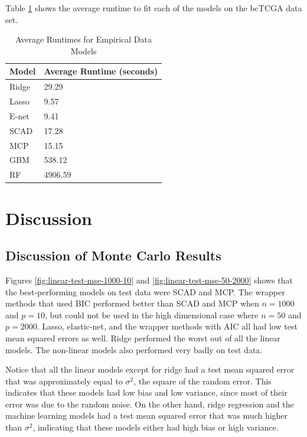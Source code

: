 \documentclass{article}
\begin{document}
	Table \ref{tab:emp_runtimes} shows the average runtime to fit each of the models on the bcTCGA data set.
	
	\begin{table}[h!]
		\centering
		\caption{Average Runtimes for Empirical Data Models}
		\label{tab:emp_runtimes}
		\begin{tabular}{ll}
			\hline
			\textbf{Model}        & \textbf{Average Runtime} (seconds) \\ \hline
			Ridge         & 29.29               \\
			Lasso         & 9.57                \\
			E-net	      & 9.41                \\
			SCAD          & 17.28               \\
			MCP           & 15.15               \\
			GBM      	  & 538.12              \\
			RF 			  & 4906.59             \\ \hline
		\end{tabular}
	\end{table}
	
	\newpage
	\section{Discussion}\label{sec:discussion}
	\subsection{Discussion of Monte Carlo Results}
	Figures \ref{fig:linear-test-mse-1000-10} and \ref{fig:linear-test-mse-50-2000} shows that the best-performing models on test data were SCAD and MCP. The wrapper methods that used BIC performed better than SCAD and MCP when $n = 1000$ and $p = 10$, but could not be used in the high dimensional case where $n = 50$ and $p = 2000$. Lasso, elastic-net, and the wrapper methods with AIC all had low test mean squared errors as well. Ridge performed the worst out of all the linear models. The non-linear models also performed very badly on test data.
	
	Notice that all the linear models except for ridge had a test mean squared error that was approximately equal to $\sigma^2$, the square of the random error. This indicates that these models had low bias and low variance, since most of their error was due to the random noise. On the other hand, ridge regression and the machine learning models had a test mean squared error that was much higher than $\sigma^2$, indicating that these models either had high bias or high variance.
	
\end{document}
